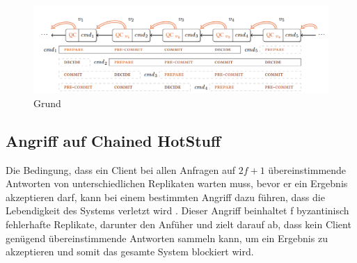 \documentclass[nonacm,sigconf,natbib=false]{acmart}
\begin{document}
\begin{figure}[htbp]
  \centering
  \includegraphics[width=\linewidth]{chained-hotstuff.png}
  \caption{Grund}
  \label{fig:chained-hotstuff}
\end{figure}

\subsection{Angriff auf Chained HotStuff}

Die Bedingung, dass ein Client bei allen Anfragen auf $2f+1$ übereinstimmende Antworten von unterschiedlichen Replikaten warten muss, bevor er ein Ergebnis akzeptieren darf, kann bei einem bestimmten Angriff dazu führen, dass die Lebendigkeit des Systems verletzt wird \cite{pbft-liveness-problem}. Dieser Angriff beinhaltet f byzantinisch fehlerhafte Replikate, darunter den Anfüher und zielt darauf ab, dass kein Client genügend übereinstimmende Antworten sammeln kann, um ein Ergebnis zu akzeptieren und somit das gesamte System blockiert wird.



\printbibliography
\end{document}
